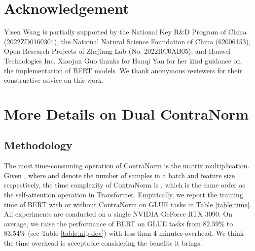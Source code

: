 \documentclass{article}
\theoremstyle{definition}
\theoremstyle{remark}
\theoremstyle{theorem}
\begin{document}
\section*{Acknowledgement}
Yisen Wang is partially supported by the National Key R\&D Program of China (2022ZD0160304), the National Natural Science Foundation of China (62006153), Open Research Projects of Zhejiang Lab (No. 2022RC0AB05), and Huawei Technologies Inc. Xiaojun Guo thanks for Hanqi Yan for her kind guidance on the implementation of BERT models. We thank anonymous reviewers for their constructive advice on this work. 





\newpage

\appendix 


\section{More Details on Dual ContraNorm} \label{appen:time}

\subsection{Methodology}

The most time-consuming operation of ContraNorm is the matrix multiplication. Given , where  and  denote the number of samples in a batch and feature size respectively, the time complexity of ContraNorm is , which is the same order as the self-attention operation in Transformer. Empirically, we report the training time of BERT with or without ContraNorm on GLUE tasks in Table \ref{table:time}. All experiments are conducted on a single NVIDIA GeForce RTX 3090. On average, we raise the performance of BERT on GLUE tasks from 82.59\% to 83.54\% (see Table \ref{table:nlp-dev}) with less than 4 minutes overhead. We think the time overhead is acceptable considering the benefits it brings. 

\begin{table}[h]
	\centering
	\caption{Estimated training time of BERT with or without ContraNorm on GLUE tasks. All experiments are conducted on a single NVIDIA GeForce RTX 3090.  is the abbreviation for second. \textbf{Avg} denotes the average training time across all the tasks.} 
	\label{table:time}
\end{table}
\end{document}
